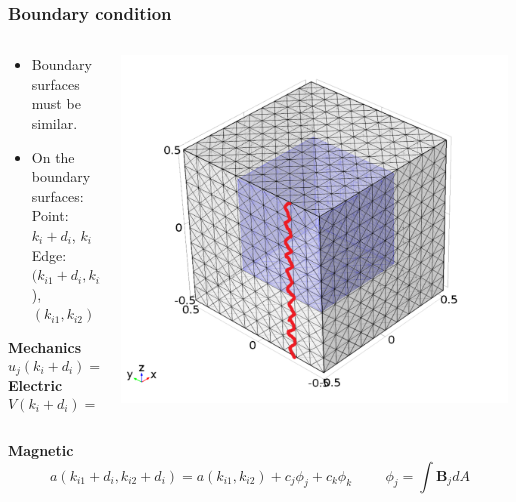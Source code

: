 \documentclass[compress]{beamer}
\begin{document}
\begin{frame}\frametitle{Boundary condition}
\begin{columns}[totalwidth=\textwidth]
   \begin{column}{.51\textwidth}
   \begin{itemize}[label=$\bullet$, font=\small, leftmargin=*]
	\item Boundary surfaces must be similar.
	\item On the boundary surfaces: \\
	Point: $k_i + d_i$, $k_i$ \\
	Edge: $(k_{i1}+d_i,k_{i2}+d_i$), $(k_{i1},k_{i2})$
	\end{itemize}
\textbf{Mechanics}
\begin{equation*}
u_j(k_i+d_i) = u_j(k_i)+\bar{S}_{ij}d_i
\end{equation*}
\textbf{Electric}
\begin{equation*}
V(k_i+d_i) = V(k_i)+\bar{E}_{i}d_i
\end{equation*}
   \end{column}
   \begin{column}{.49\textwidth}
   \includegraphics[width=0.99\textwidth]{Graphic/04_meshperiocondi.pdf}
   \end{column}
\end{columns}
\textbf{Magnetic}
\begin{equation*}
a(k_{i1}+d_i,k_{i2}+d_i) = a(k_{i1},k_{i2})+ c_j \phi_j + c_k\phi_k \hspace{1cm} \phi_j = \int \boldsymbol{B}_jdA

\end{equation*}
\end{frame}
\end{document}
